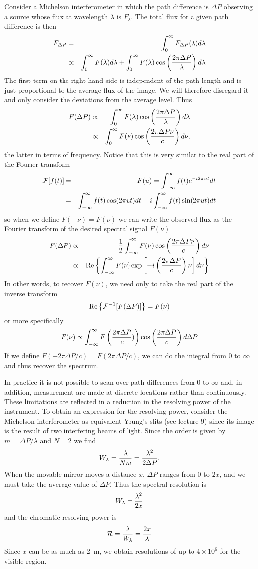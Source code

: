 \documentclass{article}
\newcommand{\bua}{\begin{eqnarray*}}
\newcommand{\eua}{\end{eqnarray*}}
\def\cl#1{{\cal #1}}               %
\begin{document}
Consider a Michelson interferometer in which the path difference is $\Delta P$ observing a source whose flux at wavelength $\lambda$ is $F_\lambda$. The total flux for a given 
path difference is then
\bua
F_{\Delta P}&=&\int_0^\infty F_{\Delta P}(\lambda)d\lambda \\
                  &\propto&\int_0^\infty F(\lambda)d\lambda+\int_0^{\infty} F(\lambda)\cos\left({2\pi\Delta P\over\lambda}\right)d\lambda
\eua
The first term on the right hand side is independent of the path length and is just 
proportional to the average flux of the image. We will therefore disregard it and only consider the deviations from the average level. Thus
\bua
F(\Delta P)&\propto&\int_0^\infty F(\lambda)\cos\left({2\pi\Delta P\over\lambda}\right)d\lambda \\
                &\propto&\int_0^\infty F(\nu)\cos\left({2\pi\Delta P\nu\over c}\right)d\nu,
\eua
the latter in terms of frequency. Notice that this is very similar to the real part of the 
Fourier transform
\bua
\cl{F}[f(t)]&=&F(u)=\int_{-\infty}^{\infty}f(t)e^{-i2\pi ut}dt \\
    &=&\int_{-\infty}^{\infty}f(t)\cos({2\pi ut})dt
         -i\int_{-\infty}^{\infty}f(t)\sin({2\pi ut})dt
\eua
so when we define $F(-\nu)=F(\nu)$ we can write the observed flux as the Fourier transform of the desired spectral signal $F(\nu)$
\bua
F(\Delta P)&\propto&
{1\over 2}\int_{-\infty}^{\infty}F(\nu)\cos\left({2\pi\Delta P\nu\over c}\right)d\nu \\
                &\propto&{\rm Re}\left\{
             \int_{-\infty}^{\infty}F(\nu)
            \exp\left[-i\left({2\pi\Delta P\over c}\right)\nu\right]
             d\nu\right\} \\
\eua
In other words, to recover $F(\nu)$, we need only to take the real part of the inverse transform 
\[
{\rm Re}\left\{\cl{F}^{-1}[F(\Delta P)]\right\}=F(\nu)
\]
or more specifically
\[
F(\nu)\propto\int_{-\infty}^{\infty}F\left({2\pi\Delta P\over c})\right)
\cos\left({2\pi\Delta P\over c}\right)d\Delta P
\]
If we define $F(-{2\pi\Delta P/c})=F({2\pi\Delta P/c})$, we can do the integral from $0$ to $\infty$ and thus recover the spectrum. 

In practice it is not possible to scan over path differences from 0 to $\infty$ and, in 
addition, measurement are made at discrete locations rather than continuously. These
limitations are reflected in a reduction in the resolving power of the instrument. To obtain an expression for the resolving power, consider the Michelson interferometer as equivalent Young's slits (see lecture 9) since its image is the result of two interfering
beams of light. Since the order is given by $m=\Delta P/\lambda$ and $N=2$ we find
\[
W_\lambda={\lambda\over Nm}={\lambda^2\over 2\Delta P}.
\]
When the movable mirror moves a distance $x$, $\Delta P$ ranges from $0$ to $2x$, and we must take the average value of $\Delta P$. Thus the spectral resolution is
\[
W_\lambda={\lambda^2\over 2x}
\]
and the chromatic resolving power is 
\[
\cl{R}={\lambda\over W_\lambda}={2x\over\lambda}
\]
Since $x$ can be as much as 2~m, we obtain resolutions of up to $4\times 10^6$ for the
visible region. 
\end{document}
